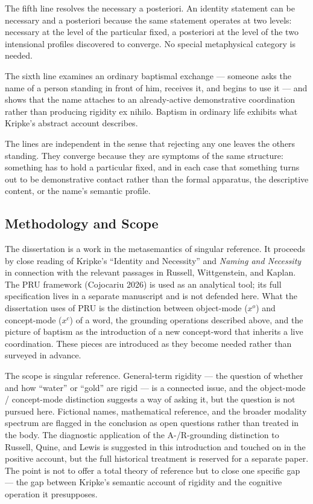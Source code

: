 \documentclass[12pt,a4paper]{article}
\begin{document}
The fifth line resolves the necessary a posteriori. An identity statement can be necessary and a posteriori because the same statement operates at two levels: necessary at the level of the particular fixed, a posteriori at the level of the two intensional profiles discovered to converge. No special metaphysical category is needed.

The sixth line examines an ordinary baptismal exchange --- someone asks the name of a person standing in front of him, receives it, and begins to use it --- and shows that the name attaches to an already-active demonstrative coordination rather than producing rigidity ex nihilo. Baptism in ordinary life exhibits what Kripke's abstract account describes.

The lines are independent in the sense that rejecting any one leaves the others standing. They converge because they are symptoms of the same structure: something has to hold a particular fixed, and in each case that something turns out to be demonstrative contact rather than the formal apparatus, the descriptive content, or the name's semantic profile.

\subsection{Methodology and Scope}\label{methodology-and-scope}

The dissertation is a work in the metasemantics of singular reference. It proceeds by close reading of Kripke's ``Identity and Necessity'' and \emph{Naming and Necessity} in connection with the relevant passages in Russell, Wittgenstein, and Kaplan. The PRU framework (Cojocariu 2026) is used as an analytical tool; its full specification lives in a separate manuscript and is not defended here. What the dissertation uses of PRU is the distinction between object-mode (\(x^o\)) and concept-mode (\(x^c\)) of a word, the grounding operations described above, and the picture of baptism as the introduction of a new concept-word that inherits a live coordination. These pieces are introduced as they become needed rather than surveyed in advance.

The scope is singular reference. General-term rigidity --- the question of whether and how ``water'' or ``gold'' are rigid --- is a connected issue, and the object-mode / concept-mode distinction suggests a way of asking it, but the question is not pursued here. Fictional names, mathematical reference, and the broader modality spectrum are flagged in the conclusion as open questions rather than treated in the body. The diagnostic application of the A-/R-grounding distinction to Russell, Quine, and Lewis is suggested in this introduction and touched on in the positive account, but the full historical treatment is reserved for a separate paper. The point is not to offer a total theory of reference but to close one specific gap --- the gap between Kripke's semantic account of rigidity and the cognitive operation it presupposes.
\end{document}
